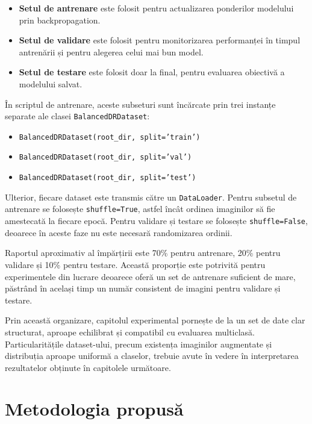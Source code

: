 \documentclass[12pt, a4paper, oneside, romanian]{teza-upb}
\begin{document}
\begin{itemize}
  \item \textbf{Setul de antrenare} este folosit pentru actualizarea ponderilor modelului prin backpropagation.
  \item \textbf{Setul de validare} este folosit pentru monitorizarea performanței în timpul antrenării și pentru alegerea celui mai bun model.
  \item \textbf{Setul de testare} este folosit doar la final, pentru evaluarea obiectivă a modelului salvat.
\end{itemize}

În scriptul de antrenare, aceste subseturi sunt încărcate prin trei instanțe separate ale clasei \texttt{BalancedDRDataset}:

\begin{itemize}
  \item \texttt{BalancedDRDataset(root\_dir, split='train')}
  \item \texttt{BalancedDRDataset(root\_dir, split='val')}
  \item \texttt{BalancedDRDataset(root\_dir, split='test')}
\end{itemize}

Ulterior, fiecare dataset este transmis către un \texttt{DataLoader}. Pentru subsetul de antrenare se folosește \texttt{shuffle=True}, astfel încât ordinea imaginilor să fie amestecată la fiecare epocă. Pentru validare și testare se folosește \texttt{shuffle=False}, deoarece în aceste faze nu este necesară randomizarea ordinii.
\bigskip

Raportul aproximativ al împărțirii este 70\% pentru antrenare, 20\% pentru validare și 10\% pentru testare. Această proporție este potrivită pentru experimentele din lucrare deoarece oferă un set de antrenare suficient de mare, păstrând în același timp un număr consistent de imagini pentru validare și testare.
\bigskip

Prin această organizare, capitolul experimental pornește de la un set de date clar structurat, aproape echilibrat și compatibil cu evaluarea multiclasă. Particularitățile dataset-ului, precum existența imaginilor augmentate și distribuția aproape uniformă a claselor, trebuie avute în vedere în interpretarea rezultatelor obținute în capitolele următoare.

\chapter{Metodologia propusă}
\end{document}
